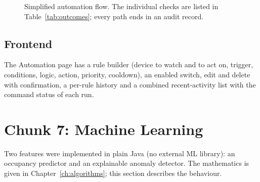 \documentclass[12pt,a4paper,oneside]{report}
\begin{document}
\begin{figure}[H]
\centering
{}
\caption{Simplified automation flow. The individual checks are listed in Table~\ref{tab:outcomes}; every path ends in an audit record.}
\label{fig:automation-flow}
\end{figure}

\subsection{Frontend}
The Automation page has a rule builder (device to watch and to act on, trigger, conditions, logic, action, priority, cooldown), an enabled switch, edit and delete with confirmation, a per-rule history and a combined recent-activity list with the command status of each run.

\section{Chunk 7: Machine Learning}
Two features were implemented in plain Java (no external ML library): an occupancy predictor and an explainable anomaly detector. The mathematics is given in Chapter~\ref{ch:algorithms}; this section describes the behaviour.
\end{document}
